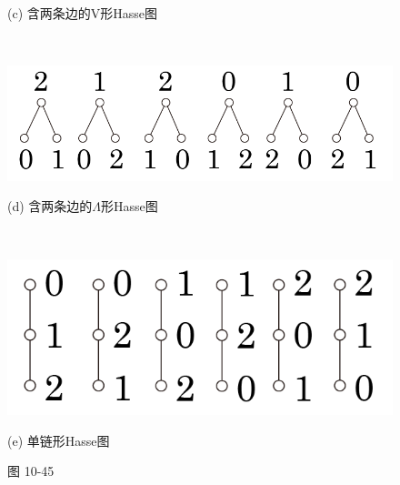 \documentclass[UTF8]{ctexart}
\begin{document}
\begin{figure}[!htb]
\begin{minipage}[t]{0.507\textwidth}
        \caption*{(c) 含两条边的V形Hasse图}
        \end{minipage}
        \\
        \begin{minipage}[t]{0.513\textwidth}
        \centering
        \includegraphics[width=1\textwidth]{10-45-d.png}
        \caption*{(d) 含两条边的$\Lambda$形Hasse图}
        \end{minipage}
        \\
        \begin{minipage}[t]{0.384\textwidth}
        \centering
        \includegraphics[width=1\textwidth]{10-45-e.png}
        \caption*{(e) 单链形Hasse图}
        \end{minipage}
        \caption*{图 10-45}
    \end{figure}
\end{document}
